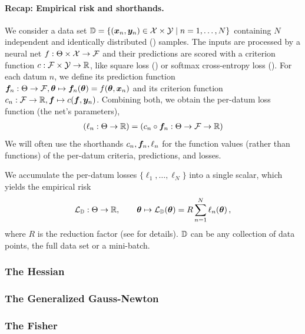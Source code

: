 \paragraph{Recap: Empirical risk and shorthands.}
We consider a data set ${\mathbb{D}} = \{({\bm{x}}_n, {\bm{y}}_n) \in {\mathcal{X}} \times {\mathcal{Y}} \mid n = 1, \dots, N \}$ containing $N$ independent and identically distributed (\iid) samples.
The inputs are processed by a neural net $f: \Theta \times {\mathcal{X}} \to {\mathcal{F}}$ and their predictions are scored with a criterion function $c: {\mathcal{F}} \times {\mathcal{Y}} \to {\mathbb{R}}$, like square loss () or softmax cross-entropy loss ().
For each datum $n$, we define its prediction function ${\bm{f}}_n: \Theta \to {\mathcal{F}}, {\bm{\theta}} \mapsto {\bm{f}}_n({\bm{\theta}}) = f({\bm{\theta}}, {\bm{x}}_n)$ and its criterion function $c_n: {\mathcal{F}} \to {\mathbb{R}}, {\bm{f}} \mapsto c({\bm{f}}, {\bm{y}}_n)$.
Combining both, we obtain the per-datum loss function (\wrt the net's parameters),
\begin{align*}
  (\ell_n: \Theta \to {\mathbb{R}}) = (c_n \circ {\bm{f}}_n: \Theta \to {\mathcal{F}} \to {\mathbb{R}})
\end{align*}
We will often use the shorthands $c_n, {\bm{f}}_n, \ell_n$ for the function values (rather than functions) of the per-datum criteria, predictions, and losses.

We accumulate the per-datum losses $\{\ell_1, \dots, \ell_N\}$ into a single scalar, which yields the empirical risk
\begin{align*}
  {\mathcal{L}}_{{\mathbb{D}}}: \Theta \to {\mathbb{R}},
  \qquad
  {\bm{\theta}} \mapsto {\mathcal{L}}_{{\mathbb{D}}}({\bm{\theta}}) = R \sum_{n=1}^N \ell_n({\bm{\theta}})\,,
\end{align*}
where $R$ is the reduction factor (see  for details).
${\mathbb{D}}$ can be any collection of data points, \eg the full data set or a mini-batch.

\subsubsection{The Hessian}\label{sec:basics_dl_hessian}


\subsubsection{The Generalized Gauss-Newton}


\subsubsection{The Fisher}\label{sec:fisher}


